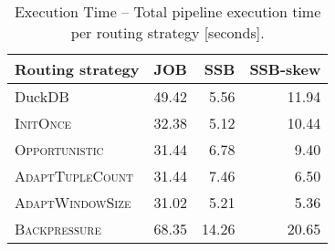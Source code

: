 \begin{table}[!t]
	\centering
	 \caption{Execution Time -- Total pipeline execution time per routing strategy [seconds].}
	 \vspace{-0.3cm}  \setlength\tabcolsep{11.4pt}
   \begin{tabular}{lrrr}
	  \toprule
		\textbf{Routing strategy} & \textbf{JOB} & \textbf{SSB} & \textbf{SSB-skew}\\
		\midrule
		DuckDB &      49.42 &       5.56 &      11.94\\
		\midrule
		\textsc{InitOnce} &      32.38 &       5.12 &      10.44\\
		\textsc{Opportunistic} &      31.44 &       6.78 &       9.40\\
		\textsc{AdaptTupleCount} &      31.44 &       7.46 &       6.50\\
		\textsc{AdaptWindowSize} &      31.02 &       5.21 &       5.36\\
		\textsc{Backpressure} &      68.35 &      14.26 &      20.65\\
		\bottomrule
	\end{tabular}
	\label{tab:3_1_pipeline}
\end{table}
